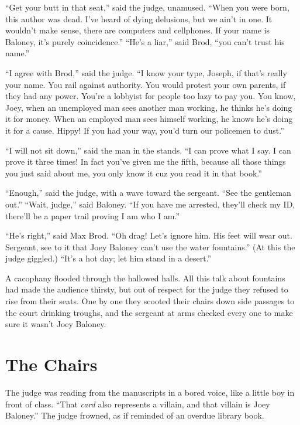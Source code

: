 \documentclass[oneside]{book}
\begin{document}
``Get your butt in that seat,'' said the judge, unamused.  ``When you were born,
this author was dead.  I've heard of dying delusions, but we ain't in one.
It wouldn't make sense, there are computers and cellphones.
If your name is Baloney, it's purely coincidence.''   ``He's a liar,'' said Brod,
``you can't trust his name.''

``I agree with Brod,'' said the judge.  ``I know your type, Joseph, if that's really your name.
You rail against authority.  You would protest your own parents, if they had any power.
You're a lobbyist for people too lazy to pay you.
You know, Joey, when an unemployed man sees another man working, he thinks he's doing it
for money.  When an employed man sees himself working, he knows he's doing it for a cause.
Hippy!
If you had your way, you'd turn our policemen to dust.''


``I will not sit down,'' said the man in the stands.  ``I can prove what I say.
I can prove it three times!  In fact you've given me the fifth, because all those
things you just said about me, you only know it cuz you read it in that book.''

``Enough,'' said the judge, with a wave toward the sergeant.
``See the gentleman out.''  ``Wait, judge,'' said Baloney.  ``If you have me
arrested, they'll check my ID, there'll be a paper trail proving I am who I am.''

``He's right,'' said Max Brod.  ``Oh drag!  Let's ignore him.  His feet will
wear out.  Sergeant, see to it that Joey Baloney can't use the water fountains.''
(At this the judge giggled.)  ``It's a hot day; let him stand in a desert.''

A cacophany flooded through the hallowed halls.
All this talk about fountains had made the audience thirsty,
but out of respect for the judge they refused to rise from their
seats.  One by one they scooted their chairs down side passages
to the court drinking troughs, and the sergeant at arms
checked every one to make sure it wasn't Joey Baloney.

\chapter{The Chairs}

The judge was reading from the manuscripts in a bored voice,
like a little boy in front of class.
``That \emph{card} also represents a villain,
and that villain is Joey Baloney.''  
The judge frowned,
as if reminded of an overdue library book.
\end{document}
